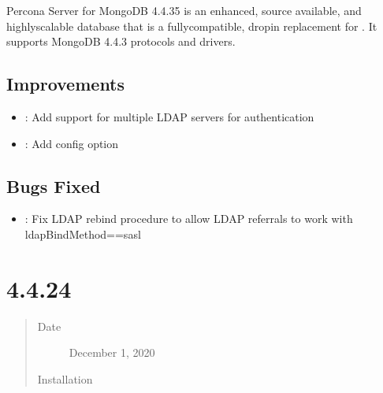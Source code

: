 \documentclass[letterpaper,10pt,english]{sphinxmanual}
\begin{document}
\sphinxAtStartPar
Percona Server for MongoDB 4.4.3\sphinxhyphen{}5 is an enhanced, source available, and highly\sphinxhyphen{}scalable database that is a
fully\sphinxhyphen{}compatible, drop\sphinxhyphen{}in replacement for .
It supports MongoDB 4.4.3 protocols and drivers.


\subsection{Improvements}
\label{\detokenize{release_notes/4.4.3-5:improvements}}\begin{itemize}
\item {} 
\sphinxAtStartPar
{}: Add support for multiple LDAP servers for authentication

\item {} 
\sphinxAtStartPar
{}: Add  config option

\end{itemize}


\subsection{Bugs Fixed}
\label{\detokenize{release_notes/4.4.3-5:bugs-fixed}}\begin{itemize}
\item {} 
\sphinxAtStartPar
{}: Fix LDAP rebind procedure to allow LDAP referrals to work with ldapBindMethod==sasl

\end{itemize}


\section{ 4.4.2\sphinxhyphen{}4}
\label{\detokenize{release_notes/4.4.2-4:percona-server-for-mongodb-4-4-2-4}}\label{\detokenize{release_notes/4.4.2-4:psmdb-4-4-2-4}}\label{\detokenize{release_notes/4.4.2-4::doc}}\begin{quote}\begin{description}
\item[{Date}] \leavevmode
\sphinxAtStartPar
December 1, 2020

\item[{Installation}] \leavevmode
\sphinxAtStartPar
{}

\end{description}\end{quote}
\end{document}
